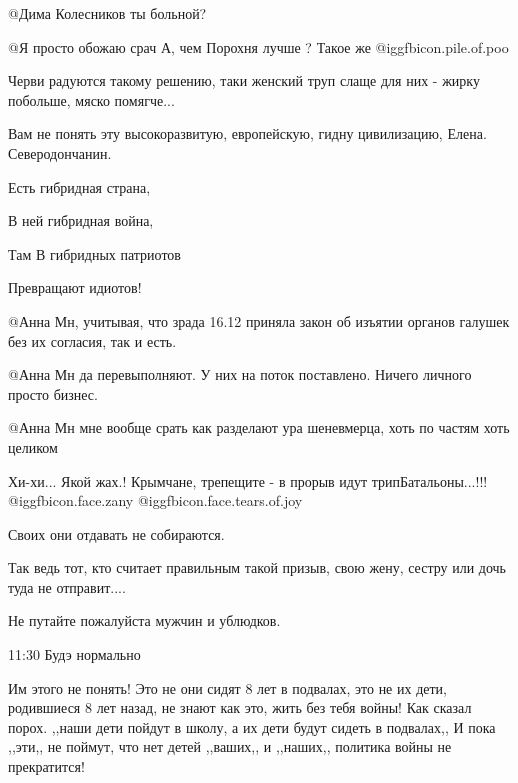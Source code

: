 \begin{itemize}
 @Дима Колесников  ты больной?

 @Я просто обожаю срач  А, чем Порохня лучше ? Такое же  @igg{fbicon.pile.of.poo} 


Черви радуются такому решению, таки женский труп слаще для них - жирку побольше, мяско помягче...

Вам не понять эту высокоразвитую, европейскую, гидну цивилизацию, Елена. Северодончанин.


Есть гибридная страна, 

В ней гибридная война, 

Там В гибридных патриотов

Превращают идиотов! 


@Анна Мн, учитывая, что зрада 16.12 приняла закон об изъятии органов галушек без их согласия, так и есть.


 @Анна Мн  да перевыполняют. У них на поток поставлено. Ничего личного просто бизнес.

 @Анна Мн  мне вообще срать как разделают ура шеневмерца, хоть по частям хоть целиком

Хи-хи...    Якой жах.! 
Крымчане, трепещите - в прорыв идут трипБатальоны...!!!  @igg{fbicon.face.zany}  @igg{fbicon.face.tears.of.joy} 


Своих они отдавать не собираются.


Так ведь тот, кто считает правильным такой призыв, свою жену, сестру или дочь
туда не отправит.... 


Не путайте пожалуйста мужчин и ублюдков.

11:30 Будэ нормально


Им этого не понять! Это не они сидят 8 лет в подвалах, это не их дети,
родившиеся 8 лет назад, не знают как это, жить без тебя войны! Как сказал порох.
,,наши дети пойдут в школу, а их дети будут сидеть в подвалах,, И пока ,,эти,, не
поймут, что нет детей ,,ваших,, и ,,наших,, политика войны не прекратится! 


\end{itemize}
